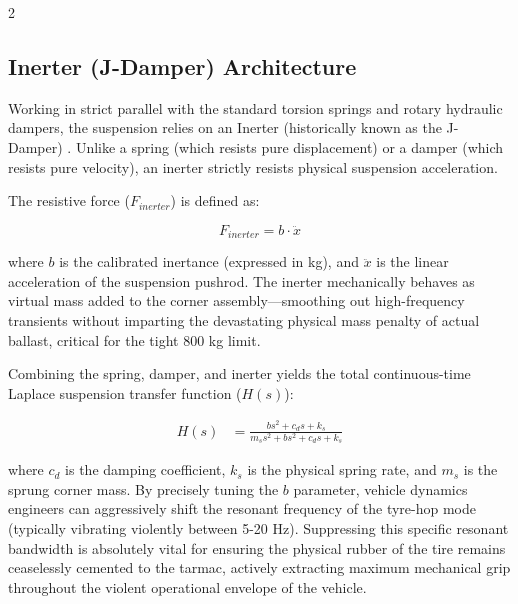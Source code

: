 \begin{multicols}{2}
\subsection{Inerter (J-Damper) Architecture}

Working in strict parallel with the standard torsion springs and rotary hydraulic dampers, the suspension relies on an Inerter (historically known as the J-Damper) \cite{inerter_mechanics_lit}. Unlike a spring (which resists pure displacement) or a damper (which resists pure velocity), an inerter strictly resists physical suspension acceleration. 

The resistive force ($F_{inerter}$) is defined as:

\begin{equation} \label{eq:inerter_force}
F_{inerter} = b \cdot \ddot{x}
\end{equation}

where $b$ is the calibrated inertance (expressed in kg), and $\ddot{x}$ is the linear acceleration of the suspension pushrod. The inerter mechanically behaves as virtual mass added to the corner assembly—smoothing out high-frequency transients without imparting the devastating physical mass penalty of actual ballast, critical for the tight 800 kg limit.

Combining the spring, damper, and inerter yields the total continuous-time Laplace suspension transfer function ($H(s)$):

\begin{equation} \label{eq:transfer_function}
\begin{split}
H(s) &= \frac{bs^2 + c_d s + k_s}{m_s s^2 + bs^2 + c_d s + k_s}
\end{split}
\end{equation}

where $c_d$ is the damping coefficient, $k_s$ is the physical spring rate, and $m_s$ is the sprung corner mass. By precisely tuning the $b$ parameter, vehicle dynamics engineers can aggressively shift the resonant frequency of the tyre-hop mode (typically vibrating violently between 5-20 Hz). Suppressing this specific resonant bandwidth is absolutely vital for ensuring the physical rubber of the tire remains ceaselessly cemented to the tarmac, actively extracting maximum mechanical grip throughout the violent operational envelope of the vehicle.
\end{multicols}

